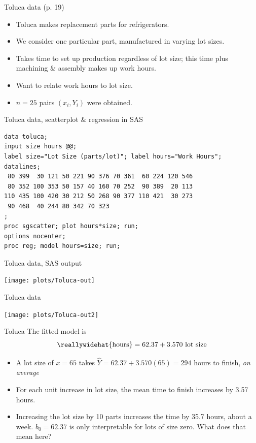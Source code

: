 \documentclass{beamer}
\begin{document}
\begin{frame}{Toluca data (p. 19)}
\begin{itemize}
\item Toluca makes replacement parts for refrigerators.
\item We consider one particular part, manufactured in varying lot sizes.
\item Takes time to set up production regardless of lot size; this time plus machining \& assembly makes up work hours.
\item Want to relate work hours to lot size.
\item $n=25$ pairs $(x_i, Y_i)$ were obtained.
\end{itemize}
\end{frame}

\begin{frame}[fragile]
{Toluca data, scatterplot \& regression in SAS}
\begin{verbatim}
data toluca;
input size hours @@;
label size="Lot Size (parts/lot)"; label hours="Work Hours";
datalines;
 80 399  30 121 50 221 90 376 70 361  60 224 120 546
 80 352 100 353 50 157 40 160 70 252  90 389  20 113
110 435 100 420 30 212 50 268 90 377 110 421  30 273
 90 468  40 244 80 342 70 323
;
proc sgscatter; plot hours*size; run;
options nocenter;
proc reg; model hours=size; run;
\end{verbatim}
\end{frame}

\begin{frame}{Toluca data, SAS output}
\begin{center}
\texttt{[image: plots/Toluca-out]}
\end{center}
\end{frame}

\begin{frame}{Toluca data}
\begin{center}
\texttt{[image: plots/Toluca-out2]}
\end{center}
\end{frame}

\begin{frame}{Toluca}
The fitted model is
$$
\reallywidehat{\rm hours} = 62.37 + 3.570 \text{ lot size}
$$
\begin{itemize}
\item A lot size of $x=65$ takes $\hat{Y}=62.37+3.570(65)=294$ hours to finish, \textit{on average}
\item For each unit increase in lot size, the mean time to finish increases by 3.57 hours.
\item Increasing the lot size by 10 parts increases the time by 35.7 hours, about a week.
$b_0=62.37$ is only interpretable for lots of size zero. What does that mean here?
\end{itemize}
\end{frame}
\end{document}

